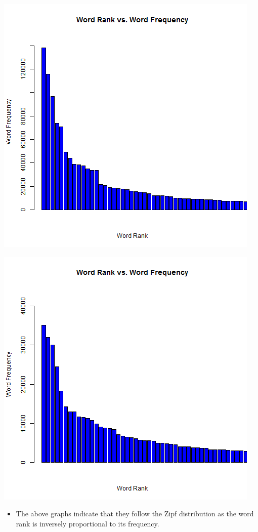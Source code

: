 	\begin{minipage}{\linewidth}
		\centering
			\includegraphics[scale=0.55]{figures/beforeBP.png}
		\label{wordCount}
	\end{minipage}
	\begin{minipage}{\linewidth}
		\centering
			\includegraphics[scale=0.55]{figures/afterBP.png}
		\label{wordCount}
	\end{minipage}
\begin{itemize}
\item The above graphs indicate that they follow the Zipf distribution as the word rank is inversely proportional to its frequency.
\end{itemize}

